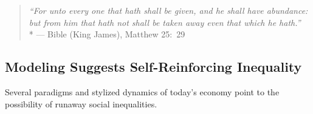 \begin{quote}
	\emph{``For unto every one that hath shall be given, and he shall have abundance:
	but from him that hath not shall be taken away even that which he hath.''}
	\\*
	--- Bible (King James), Matthew 25:~29
\end{quote}





\subsection[Models of Inequality]{Modeling Suggests Self-Reinforcing Inequality}
Several paradigms and stylized dynamics of today's economy point to the possibility of runaway social inequalities.





